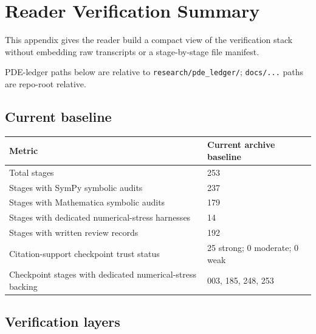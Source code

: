 \chapter{Reader Verification Summary}
\label{app:reader-verification-summary}

\def\ReaderPath#1{\begingroup\footnotesize\nolinkurl{#1}\endgroup}

This appendix gives the reader build a compact view of the verification stack
without embedding raw transcripts or a stage-by-stage file manifest.

PDE-ledger paths below are relative to \ReaderPath{research/pde_ledger/};
\ReaderPath{docs/...} paths are repo-root relative.

\section{Current baseline}

\begin{longtable}{L{0.33\textwidth}L{0.57\textwidth}}
\toprule
Metric & Current archive baseline \\
\midrule
\endhead
Total stages & 253 \\
\addlinespace
Stages with SymPy symbolic audits & 237 \\
\addlinespace
Stages with Mathematica symbolic audits & 179 \\
\addlinespace
Stages with dedicated numerical-stress harnesses & 14 \\
\addlinespace
Stages with written review records & 192 \\
\addlinespace
Citation-support checkpoint trust status & 25 strong; 0 moderate; 0 weak \\
\addlinespace
Checkpoint stages with dedicated numerical-stress backing & 003, 185, 248, 253 \\
\bottomrule
\end{longtable}

\section{Verification layers}

